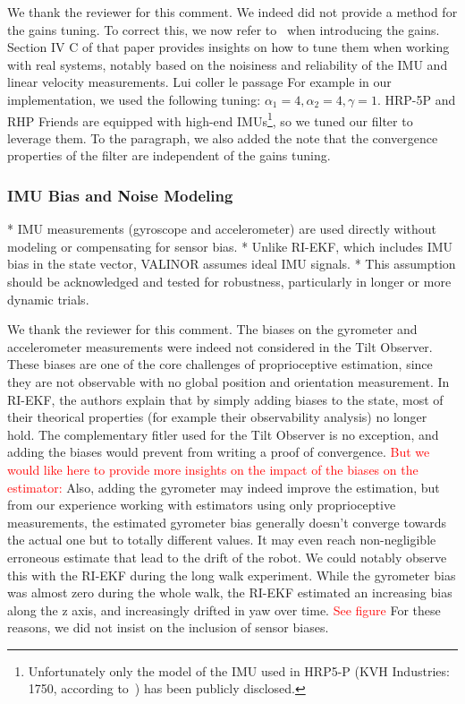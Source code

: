 We thank the reviewer for this comment. We indeed did not provide a method for the gains tuning. To correct this, we now refer to~\cite{benallegue2023velocity} when introducing the gains. Section IV C of that paper provides insights on how to tune them when working with real systems, notably based on the noisiness and reliability of the IMU and linear velocity measurements.  \alert{Lui coller le passage} For example in our implementation, we used the following tuning: $\alpha_{1} = 4, \alpha_{2} = 4, \gamma = 1$. HRP-5P and RHP Friends are equipped with high-end IMUs\footnote{Unfortunately only the model of the IMU used in HRP5-P (KVH Industries: 1750, according to~\cite{Kaneko2019Hrp5}) has been publicly disclosed.}, so we tuned our filter to leverage them. 
To the paragraph, we also added the note that the convergence properties of the filter are independent of the gains tuning. 

\subsubsection{IMU Bias and Noise Modeling}

\begin{revquote}
* IMU measurements (gyroscope and accelerometer) are used directly without modeling or compensating for sensor bias.
* Unlike RI-EKF, which includes IMU bias in the state vector, VALINOR assumes ideal IMU signals.
* This assumption should be acknowledged and tested for robustness, particularly in longer or more dynamic trials.
\end{revquote}

We thank the reviewer for this comment. The biases on the gyrometer and accelerometer measurements were indeed not considered in the Tilt Observer. These biases are one of the core challenges of proprioceptive estimation, since they are not observable with no global position and orientation measurement. In RI-EKF, the authors explain that by simply adding biases to the state, most of their theorical properties (for example their observability analysis) no longer hold. The complementary fitler used for the Tilt Observer is no exception, and adding the biases would prevent from writing a proof of convergence.
\textcolor{red}{
But we would like here to provide more insights on the impact of the biases on the estimator:}
Also, adding the gyrometer may indeed improve the estimation, but from our experience working with estimators using only proprioceptive measurements, the estimated gyrometer bias generally doesn't converge towards the actual one but to totally different values. It may even reach non-negligible erroneous estimate that lead to the drift of the robot. We could notably observe this with the RI-EKF during the long walk experiment. While the gyrometer bias was almost zero during the whole walk, the RI-EKF estimated an increasing bias along the z axis, and increasingly drifted in yaw over time.   \textcolor{red}{See figure}
For these reasons, we did not insist on the inclusion of sensor biases.

